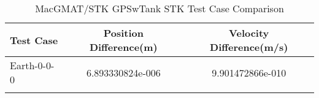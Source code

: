 \begin{table}[htbp!]
\centering
\caption{ MacGMAT/STK GPSwTank STK Test Case Comparison}
      \begin{tabular}{lcc}
      \hline\hline
          Test Case & Position Difference(m) & Velocity Difference(m/s) \\
         \hline
         Earth-0-0-0 & 6.893330824e-006 & 9.901472866e-010 \\
      \hline\hline
      \label{Table: GPSwTank STK Table} 
\end{tabular}
\end{table}
